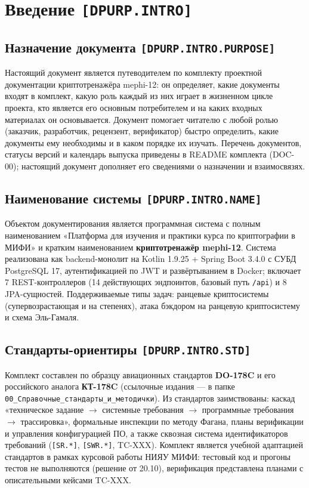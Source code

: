 \documentclass[12pt,a4paper]{article}
\begin{document}
\clearpage
\tableofcontents
\clearpage


\section{Введение \texttt{[DPURP.INTRO]}}

\subsection{Назначение документа \texttt{[DPURP.INTRO.PURPOSE]}}
Настоящий документ является путеводителем по комплекту проектной документации
криптотренажёра mephi-12: он определяет, какие документы входят в комплект, какую
роль каждый из них играет в жизненном цикле проекта, кто является его основным
потребителем и на каких входных материалах он основывается. Документ помогает
читателю с любой ролью (заказчик, разработчик, рецензент, верификатор) быстро
определить, какие документы ему необходимы и в каком порядке их изучать.
Перечень документов, статусы версий и календарь выпуска приведены в README
комплекта (DOC-00); настоящий документ дополняет его сведениями о назначении
и взаимосвязях.

\subsection{Наименование системы \texttt{[DPURP.INTRO.NAME]}}
Объектом документирования является программная система с полным наименованием
«Платформа для изучения и практики курса по криптографии в МИФИ» и кратким
наименованием \textbf{криптотренажёр mephi-12}. Система реализована как backend-монолит
на Kotlin 1.9.25 + Spring Boot 3.4.0 с СУБД PostgreSQL 17, аутентификацией по JWT
и развёртыванием в Docker; включает 7 REST-контроллеров (14 действующих эндпоинтов,
базовый путь \texttt{/api}) и 8 JPA-сущностей. Поддерживаемые типы задач:
ранцевые криптосистемы (супервозрастающая и на степенях), атака бэкдором на
ранцевую криптосистему и схема Эль-Гамаля.

\subsection{Стандарты-ориентиры \texttt{[DPURP.INTRO.STD]}}
Комплект составлен по образцу авиационных стандартов \textbf{DO-178C} и его
российского аналога \textbf{КТ-178C} (ссылочные издания — в папке
\texttt{00\_Справочные\_стандарты\_и\_методички}). Из стандартов заимствованы:
каскад «техническое задание $\rightarrow$ системные требования $\rightarrow$
программные требования $\rightarrow$ трассировка», формальные инспекции по методу
Фагана, планы верификации и управления конфигурацией ПО, а также сквозная
система идентификаторов требований (\texttt{[SR.*]}, \texttt{[SWR.*]}, TC-XXX).
Комплект является учебной адаптацией стандартов в рамках курсовой работы НИЯУ МИФИ:
тестовый код и прогоны тестов не выполняются (решение от 20.10), верификация
представлена планами с описательными кейсами TC-XXX.
\end{document}
